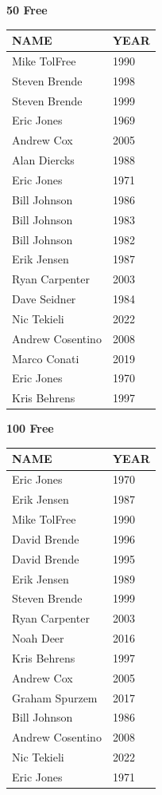 \begin{table}[H]
\centering
\begin{minipage}[t]{0.48\textwidth}
\centering
\textbf{50 Free}\\[0.1cm]
\begin{tabular}{@{}p{2.8cm}p{1.2cm}@{}}
\hline
    \textbf{NAME} & \textbf{YEAR} \\
\hline
    Mike TolFree & 1990 \\
    Steven Brende & 1998 \\
    Steven Brende & 1999 \\
    Eric Jones & 1969 \\
    Andrew Cox & 2005 \\
    Alan Diercks & 1988 \\
    Eric Jones & 1971 \\
    Bill Johnson & 1986 \\
    Bill Johnson & 1983 \\
    Bill Johnson & 1982 \\
    Erik Jensen & 1987 \\
    Ryan Carpenter & 2003 \\
    Dave Seidner & 1984 \\
    Nic Tekieli & 2022 \\
    Andrew Cosentino & 2008 \\
    Marco Conati & 2019 \\
    Eric Jones & 1970 \\
    Kris Behrens & 1997 \\
\hline
\end{tabular}
\end{minipage}\hfill
\begin{minipage}[t]{0.48\textwidth}
\centering
\textbf{100 Free}\\[0.1cm]
\begin{tabular}{@{}p{2.8cm}p{1.2cm}@{}}
\hline
    \textbf{NAME} & \textbf{YEAR} \\
\hline
    Eric Jones & 1970 \\
    Erik Jensen & 1987 \\
    Mike TolFree & 1990 \\
    David Brende & 1996 \\
    David Brende & 1995 \\
    Erik Jensen & 1989 \\
    Steven Brende & 1999 \\
    Ryan Carpenter & 2003 \\
    Noah Deer & 2016 \\
    Kris Behrens & 1997 \\
    Andrew Cox & 2005 \\
    Graham Spurzem & 2017 \\
    Bill Johnson & 1986 \\
    Andrew Cosentino & 2008 \\
    Nic Tekieli & 2022 \\
    Eric Jones & 1971 \\
\hline
\end{tabular}
\end{minipage}
\end{table}

